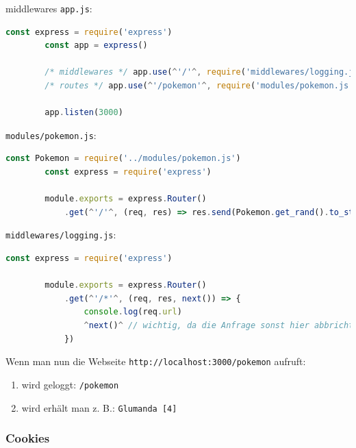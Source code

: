 \begin{example}{middlewares}
    \texttt{app.js}:
    \begin{lstlisting}[language=JavaScript]
        const express = require('express')
        const app = express()

        /* middlewares */ app.use(^'/'^, require('middlewares/logging.js')) // 1.
        /* routes */ app.use(^'/pokemon'^, require('modules/pokemon.js')) // 2.

        app.listen(3000)
    \end{lstlisting}

    \texttt{modules/pokemon.js}:
    \begin{lstlisting}[language=JavaScript]
        const Pokemon = require('../modules/pokemon.js')
        const express = require('express')
        
        module.exports = express.Router()
            .get(^'/'^, (req, res) => res.send(Pokemon.get_rand().to_string()) )
    \end{lstlisting}

    \texttt{middlewares/logging.js}:
    \begin{lstlisting}[language=JavaScript]
        const express = require('express')
        
        module.exports = express.Router()
            .get(^'/*'^, (req, res, next()) => {
                console.log(req.url)
                ^next()^ // wichtig, da die Anfrage sonst hier abbricht
            })
    \end{lstlisting}

    Wenn man nun die Webseite \texttt{http://localhost:3000/pokemon} aufruft:
    \begin{enumerate}
        \item wird geloggt: \texttt{/pokemon}
        \item wird erhält man z. B.: \texttt{Glumanda [4]}
    \end{enumerate}
\end{example}

\subsubsection{Cookies}

